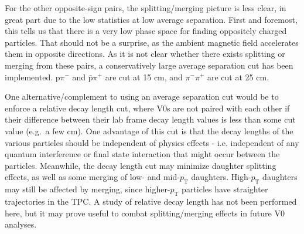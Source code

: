 For the other opposite-sign pairs, the splitting/merging picture is less clear, in great part due to the low statistics at low average separation.
First and foremost, this tells us that there is a very low phase space for finding oppositely charged particles. 
That should not be a surprise, as the ambient magnetic field accelerates them in opposite directions.
As it is not clear whether there exists splitting or merging from these pairs, a conservatively large average separation cut has been implemented. p$\pi^-$ and $\bar{\mathrm{p}}\pi^+$ are cut at 15 cm, and $\pi^-\pi^+$ are cut at 25 cm.

One alternative/complement to using an average separation cut would be to enforce a relative decay length cut, where V0s are not paired with each other if their difference between their lab frame decay length values is less than some cut value (e.g.\ a few cm).  
One advantage of this cut is that the decay lengths of the various particles should be independent of physics effects - i.e. independent of any quantum interference or final state interaction that might occur between the particles.  
Meanwhile, the decay length cut may minimize daughter splitting effects, as well as some merging of low- and mid-$p_{\mathrm{T}}$ daughters.  
High-$p_{\mathrm{T}}$ daughters may still be affected by merging, since higher-$p_{\mathrm{T}}$ particles have straighter trajectories in the TPC.  
A study of relative decay length has not been performed here, but it may prove useful to combat splitting/merging effects in future V0 analyses.

